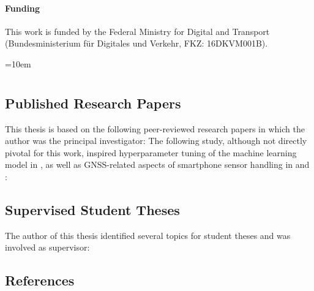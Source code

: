 \documentclass[
  ngerman,english, %
  fontsize=12pt,twoside,BCOR=6mm, %
  numbers=noenddot, %
  cd=fullcolor,
  open=right,
  headings=heavy,
  chapterpage=true,
  cdfont=off, %
  sfdefaults=false,
]{tudscrmanual}
\begin{document}
\subsubsection*{Funding}

This work is funded by the Federal Ministry for Digital and Transport (Bundesministerium für Digitales und Verkehr, FKZ: 16DKVM001B).
\vfill

\newpage

\tableofcontents


\nocite{matthes2022matching}
\nocite{matthes2023geo}
\nocite{matthes2023accurate}
\nocite{matthes2022selecting}

\nocite{lorenz_2022}
\nocite{pickhardt_2022}
\nocite{jeschor_2022}
\nocite{lahr_2023}
\nocite{pickhardt_2023}
\nocite{wieland_2023}
\nocite{pix_2024}


% 
% 
% 
% 
% 

\newpage

\emergencystretch=10em

\chapter*{\bibname}

\section*{Published Research Papers}
This thesis is based on the following peer-reviewed research papers in which the author was the principal investigator:
\printbibliography[heading=none,nottype=student,keyword={ownpaper,related}]
The following study, although not directly pivotal for this work, inspired hyperparameter tuning of the machine learning model in , as well as GNSS-related aspects of smartphone sensor handling in  and :
\printbibliography[heading=none,notkeyword={student},keyword={ownpaper,notrelated}]
\vfill
\pagebreak

\section*{Supervised Student Theses}
The author of this thesis identified several topics for student theses and was involved as supervisor:
\printbibliography[heading=none,keyword={student},notkeyword={ownpaper}]
\vfill
\pagebreak

\section*{References}
\printbibliography[heading=none,notkeyword={student},notkeyword={ownpaper,notrelated},notkeyword={ownpaper,related}]
\vfill
\pagebreak

\newpage
\renewcommand{\glsnamefont}[1]{\color{cidarkblue} \textbf{#1} \dotfill}
\printunsrtglossary[type=abbreviations,title={Abbreviations}]
\end{document}
